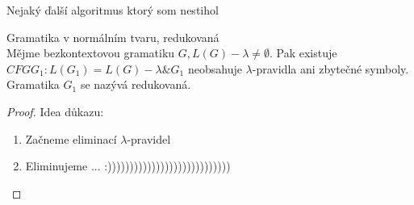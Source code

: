 \documentclass[../main.tex]{subfiles}
\begin{document}
\begin{definition}
    Nejaký ďalší algoritmus ktorý som nestihol\\


\end{definition}

\begin{theorem}
    Gramatika v normálním tvaru, redukovaná\\

    Mějme bezkontextovou gramatiku $G, L(G) - {\lambda} \neq \emptyset$. Pak existuje $CFG G_1: L(G_1) = L(G) - {\lambda} \& G_1 $ neobsahuje $\lambda$-pravidla ani zbytečné symboly. 
    Gramatika $G_1$ se nazývá redukovaná.

    \begin{proof}
        Idea důkazu:
        \begin{enumerate}
            \item Začneme eliminací $\lambda$-pravidel
            \item Eliminujeme ... :))))))))))))))))))))))))))))
        \end{enumerate}
    \end{proof}
\end{theorem}
\end{document}
